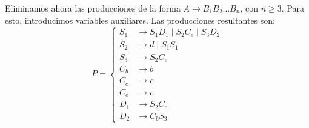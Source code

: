 \begin{ejercicio}
    Eliminamos ahora las producciones de la forma $A\to B_1B_2\ldots B_n$, con $n\geq 3$. Para esto, introducimos variables auxiliares. Las producciones resultantes son:
    \begin{equation*}
        P = \left\{
            \begin{aligned}
                S_1 &\rightarrow S_1 D_1 \mid S_2C_e \mid S_3 D_2 \\
                S_2 &\rightarrow d \mid S_1 S_1\\
                S_3 &\rightarrow S_2 C_e\\
                C_b &\rightarrow b\\
                C_c &\rightarrow c\\
                C_e &\rightarrow e \\
                D_1 &\rightarrow S_2 C_c \\
                D_2 &\rightarrow C_b S_3
            \end{aligned}
        \right.
    \end{equation*}
\end{ejercicio}


